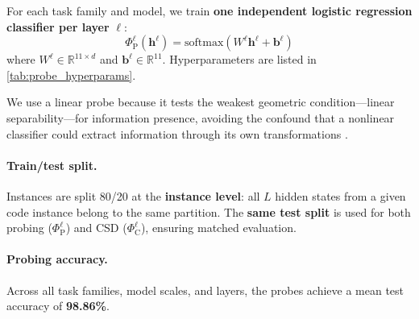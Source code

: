 For each task family and model, we train \textbf{one independent logistic regression classifier per layer} $\ell$:
%
\begin{equation}
\Phi_{\mathrm{P}}^\ell(\mathbf{h}^\ell) = \mathrm{softmax}(W^\ell \mathbf{h}^\ell + \mathbf{b}^\ell)
\end{equation}
%
where $W^\ell \in \mathbb{R}^{11 \times d}$ and $\mathbf{b}^\ell \in \mathbb{R}^{11}$. Hyperparameters are listed in \cref{tab:probe_hyperparams}.

\begin{table}[H]
\centering
{}
\caption{Probing classifier hyperparameters.}
\label{tab:probe_hyperparams}
\end{table}

We use a linear probe because it tests the weakest geometric condition---linear separability---for information presence, avoiding the confound that a nonlinear classifier could extract information through its own transformations \citep{belinkov2022probing, hewitt2019designing}.

\paragraph{Train/test split.} Instances are split 80/20 at the \textbf{instance level}: all $L$ hidden states from a given code instance belong to the same partition. The \textbf{same test split} is used for both probing ($\Phi_{\mathrm{P}}^\ell$) and CSD ($\Phi_{\mathrm{C}}^\ell$), ensuring matched evaluation.

\paragraph{Probing accuracy.} Across all task families, model scales, and layers, the probes achieve a mean test accuracy of \textbf{98.86\%}.

